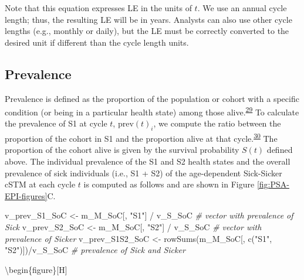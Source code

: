 \documentclass[
]{article}
\newenvironment{Shaded}{\begin{snugshade}}{\end{snugshade}}
\newcommand{\CommentTok}[1]{\textcolor[rgb]{0.56,0.35,0.01}{\textit{#1}}}
\newcommand{\FunctionTok}[1]{\textcolor[rgb]{0.00,0.00,0.00}{#1}}
\newcommand{\NormalTok}[1]{#1}
\newcommand{\OtherTok}[1]{\textcolor[rgb]{0.56,0.35,0.01}{#1}}
\newcommand{\SpecialCharTok}[1]{\textcolor[rgb]{0.00,0.00,0.00}{#1}}
\newcommand{\StringTok}[1]{\textcolor[rgb]{0.31,0.60,0.02}{#1}}
\begin{document}
Note that this equation expresses LE in the units of \(t\). We use an annual cycle length; thus, the resulting LE will be in years. Analysts can also use other cycle lengths (e.g., monthly or daily), but the LE must be correctly converted to the desired unit if different than the cycle length units.

\hypertarget{prevalence}{%
\subsection{Prevalence}\label{prevalence}}

Prevalence is defined as the proportion of the population or cohort with a specific condition (or being in a particular health state) among those alive.\textsuperscript{\protect\hyperlink{ref-Rothman2008h}{29}} To calculate the prevalence of S1 at cycle \(t\), \(\text{prev}(t)_i\), we compute the ratio between the proportion of the cohort in S1 and the proportion alive at that cycle.\textsuperscript{\protect\hyperlink{ref-Keiding1991}{30}} The proportion of the cohort alive is given by the survival probability \(S(t)\) defined above. The individual prevalence of the S1 and S2 health states and the overall prevalence of sick individuals (i.e., S1 + S2) of the age-dependent Sick-Sicker cSTM at each cycle \(t\) is computed as follows and are shown in Figure \ref{fig:PSA-EPI-figures}C.

\begin{Shaded}
\begin{Highlighting}[]
\NormalTok{v\_prev\_S1\_SoC   }\OtherTok{\textless{}{-}}\NormalTok{ m\_M\_SoC[, }\StringTok{"S1"}\NormalTok{] }\SpecialCharTok{/}\NormalTok{ v\_S\_SoC          }\CommentTok{\# vector with prevalence of Sick}
\NormalTok{v\_prev\_S2\_SoC   }\OtherTok{\textless{}{-}}\NormalTok{ m\_M\_SoC[, }\StringTok{"S2"}\NormalTok{] }\SpecialCharTok{/}\NormalTok{ v\_S\_SoC          }\CommentTok{\# vector with prevalence of Sicker}
\NormalTok{v\_prev\_S1S2\_SoC }\OtherTok{\textless{}{-}} \FunctionTok{rowSums}\NormalTok{(m\_M\_SoC[, }\FunctionTok{c}\NormalTok{(}\StringTok{"S1"}\NormalTok{, }\StringTok{"S2"}\NormalTok{)])}\SpecialCharTok{/}\NormalTok{v\_S\_SoC }\CommentTok{\# prevalence of Sick and Sicker}
\end{Highlighting}
\end{Shaded}

\textbackslash begin\{figure\}{[}H{]}
\end{document}
